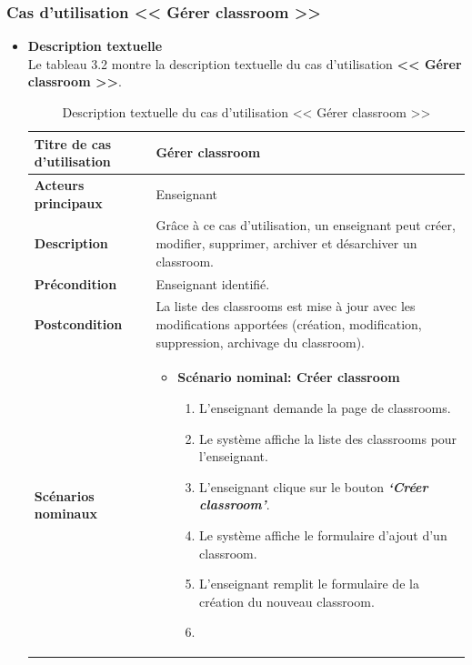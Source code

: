 \subsubsection{Cas d’utilisation << Gérer classroom >>}
\begin{itemize}[itemsep=1pt, parsep=1pt]
    \item \textbf{Description textuelle}\\
    Le tableau 3.2 montre la description textuelle du cas d’utilisation \textbf{<< Gérer classroom >>}.
    \begin{longtable}{|>{\RaggedRight\arraybackslash}p{4cm}|>{\RaggedRight\arraybackslash}p{12cm}|}
        \caption{ Description textuelle du cas d’utilisation << Gérer classroom >> } \\
        \hline
        \textbf{Titre de cas d’utilisation} & \textbf{Gérer classroom} \\
        \hline
        \textbf{Acteurs principaux} & Enseignant \\
        \hline
        \textbf{Description} & Grâce à ce cas d’utilisation, un enseignant peut créer, modifier, supprimer, archiver et désarchiver un classroom. \\
        \hline
        \textbf{Précondition} & Enseignant identifié. \\
        \hline
        \textbf{Postcondition} & La liste des classrooms est mise à jour avec les modifications apportées (création, modification, suppression, archivage du classroom). \\
        \hline
        \textbf{Scénarios nominaux} & 
        \begin{itemize}[label=]
            \item \textbf{Scénario nominal: Créer classroom}
            \begin{enumerate}
                \item L’enseignant demande la page de classrooms.
                \item Le système affiche la liste des classrooms pour l’enseignant. 
                \item L’enseignant clique sur le bouton \textbf{\textit{‘Créer classroom’}}.
                \item Le système affiche le formulaire d’ajout d’un classroom. 
                \item L’enseignant remplit le formulaire de la création du nouveau classroom.
                \item 
                \begin{enumerate}

\end{enumerate}
\end{enumerate}
\end{itemize}
\end{longtable}
\end{itemize}
